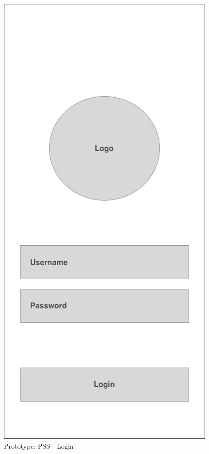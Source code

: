 \begin{figure}[ht]
    \centering
    \includegraphics[scale=0.50]{../images/prototype-pss-login.png}
    \caption{Prototype: PSS - Login}
    \label{fig:pss-prototype-login}
\end{figure}

